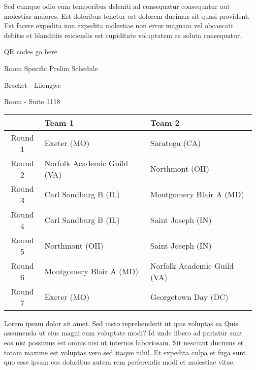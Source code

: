 \documentclass{article}%
\begin{document}
\newline%
Sed cumque odio eum temporibus deleniti ad consequatur consequatur aut molestias maiores. Est doloribus tenetur est dolorem ducimus sit quasi provident. Est facere expedita non expedita molestiae non error magnam vel obcaecati debitis et blanditiis reiciendis est cupiditate voluptatem ea soluta consequatur.%
\vspace*{140pt}%
\begin{center}%
\begin{Huge}%
QR codes go here%
\end{Huge}%
\end{center}%
\newpage%
\begin{center}%
\begin{Huge}%
Room Specific Prelim Schedule%
\end{Huge}%
\vspace*{8pt}%
\linebreak%
\begin{Large}%
Bracket {-} Lilongwe%
\end{Large}%
\vspace*{8pt}%
\linebreak%
\vspace*{8pt}%
\begin{Large}%
Room {-} Suite 1118%
\end{Large}%
\end{center}%
%
\begin{tabularx}{\textwidth}{|c|Y|Y|}%
\hline%
&Team 1&Team 2\\%
\hline%
Round 1&Exeter (MO)&Saratoga (CA)\\%
Round 2&Norfolk Academic Guild (VA)&Northmont (OH)\\%
Round 3&Carl Sandburg B (IL)&Montgomery Blair A (MD)\\%
Round 4&Carl Sandburg B (IL)&Saint Joseph (IN)\\%
Round 5&Northmont (OH)&Saint Joseph (IN)\\%
Round 6&Montgomery Blair A (MD)&Norfolk Academic Guild (VA)\\%
Round 7&Exeter (MO)&Georgetown Day (DC)\\%
\hline%
\end{tabularx}%
\vspace*{8pt}%
\newline%
Lorem ipsum dolor sit amet. Sed iusto reprehenderit ut quis voluptas ea Quis assumenda ut eius magni eum voluptate modi? Id unde libero ad pariatur sunt eos nisi possimus est omnis nisi ut internos laboriosam. Sit nesciunt ducimus et totam maxime est voluptas vero sed itaque nihil. Et expedita culpa et fuga sunt quo esse ipsam eos doloribus autem rem perferendis modi et molestiae vitae.\newline%
\end{document}
